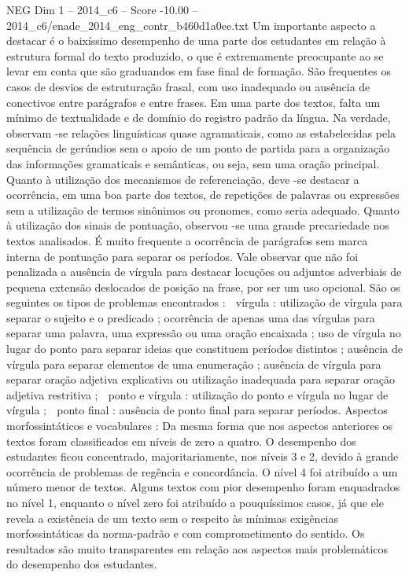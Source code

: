 \begin{textsample}{NEG Dim 1 – 2014\_c6 – Score -10.00 – 2014\_c6/enade\_2014\_eng\_contr\_b460d1a0ee.txt}
Um importante aspecto a destacar é o baixíssimo desempenho de uma parte dos estudantes em relação à estrutura formal do texto produzido, o que é extremamente preocupante ao se levar em conta que são graduandos em fase final de formação.
São frequentes os casos de desvios de estruturação frasal, com uso inadequado ou ausência de conectivos entre parágrafos e entre frases.
Em uma parte dos textos, falta um mínimo de textualidade e de domínio do registro padrão da língua.
Na verdade, observam -se relações linguísticas quase agramaticais, como as estabelecidas pela sequência de gerúndios sem o apoio de um ponto de partida para a organização das informações gramaticais e semânticas, ou seja, sem uma oração principal.
Quanto à utilização dos mecanismos de referenciação, deve -se destacar a ocorrência, em uma boa parte dos textos, de repetições de palavras ou expressões sem a utilização de termos sinônimos ou pronomes, como seria adequado.
Quanto à utilização dos sinais de pontuação, observou -se uma grande precariedade nos textos analisados.
É muito frequente a ocorrência de parágrafos sem marca interna de pontuação para separar os períodos.
Vale observar que não foi penalizada a ausência de vírgula para destacar locuções ou adjuntos adverbiais de pequena extensão deslocados de posição na frase, por ser um uso opcional.
São os seguintes os tipos de problemas encontrados :  vírgula : utilização de vírgula para separar o sujeito e o predicado ; ocorrência de apenas uma das vírgulas para separar uma palavra, uma expressão ou uma oração encaixada ; uso de vírgula no lugar do ponto para separar ideias que constituem períodos distintos ; ausência de vírgula para separar elementos de uma enumeração ; ausência de vírgula para separar oração adjetiva explicativa ou utilização inadequada para separar oração adjetiva restritiva ;  ponto e vírgula : utilização do ponto e vírgula no lugar de vírgula ;  ponto final : ausência de ponto final para separar períodos.
Aspectos morfossintáticos e vocabulares : Da mesma forma que nos aspectos anteriores os textos foram classificados em níveis de zero a quatro.
O desempenho dos estudantes ficou concentrado, majoritariamente, nos níveis 3 e 2, devido à grande ocorrência de problemas de regência e concordância.
O nível 4 foi atribuído a um número menor de textos.
Alguns textos com pior desempenho foram enquadrados no nível 1, enquanto o nível zero foi atribuído a pouquíssimos casos, já que ele revela a existência de um texto sem o respeito às mínimas exigências morfossintáticas da norma-padrão e com comprometimento do sentido.
Os resultados são muito transparentes em relação aos aspectos mais problemáticos do desempenho dos estudantes.

\end{textsample}
